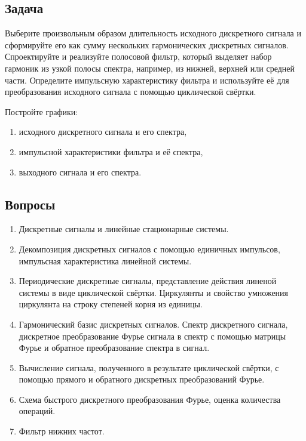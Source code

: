 \documentclass[a4paper,12pt]{article}
\begin{document}
\subsection{Задача}

Выберите произвольным образом длительность исходного дискретного сигнала и сформируйте его как сумму нескольких гармонических дискретных
сигналов. Спроектируйте и реализуйте полосовой фильтр, который выделяет набор гармоник из узкой полосы спектра, например, из нижней, верхней
или средней части. Определите импульсную характеристику фильтра и используйте её для преобразования исходного сигнала с помощью циклической
свёртки.

Постройте графики:
\begin{enumerate}
    \item исходного дискретного сигнала и его спектра,
    \item импульсной характеристики фильтра и её спектра,
    \item выходного сигнала и его спектра.
\end{enumerate}

\subsection{Вопросы}

\begin{enumerate}
    \item Дискретные сигналы и линейные стационарные системы.
    \item Декомпозиция дискретных сигналов с помощью единичных импульсов, импульсная характеристика линейной системы.
    \item Периодические дискретные сигналы, представление действия линеной системы в виде циклической свёртки. Циркулянты и свойство
        умножения циркулянта на строку степеней корня из единицы.
    \item Гармонический базис дискретных сигналов. Спектр дискретного сигнала, дискретное преобразование Фурье сигнала в спектр с помощью
        матрицы Фурье и обратное преобразование спектра в сигнал.
    \item Вычисление сигнала, полученного в результате циклической свёртки, с помощью прямого и обратного дискретных преобразований Фурье.
    \item Схема быстрого дискретного преобразования Фурье, оценка количества операций.
    \item Фильтр нижних частот.
\end{enumerate}
\end{document}
